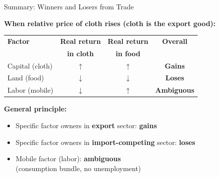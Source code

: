 \documentclass{beamer}
\begin{document}
\begin{frame}{Summary: Winners and Losers from Trade}

\textbf{When relative price of cloth rises (cloth is the export good):}

\vspace{0.3cm}

\begin{center}
\begin{tabular}{lccc}
\toprule
\textbf{Factor} & \textbf{Real return} & \textbf{Real return} & \textbf{Overall} \\
& \textbf{in cloth} & \textbf{in food} & \\
\midrule
\textcolor{capitalcolor}{Capital (cloth)} & $\uparrow$ & $\uparrow$ & \textcolor{capitalcolor}{\textbf{Gains}} \\
\textcolor{landcolor}{Land (food)} & $\downarrow$ & $\downarrow$ & \textcolor{landcolor}{\textbf{Loses}} \\
\textcolor{laborcolor}{Labor (mobile)} & $\downarrow$ & $\uparrow$ & \textcolor{laborcolor}{\textbf{Ambiguous}} \\
\bottomrule
\end{tabular}
\end{center}

\vspace{0.5cm}

\textbf{General principle:}
\begin{itemize}
    \item Specific factor owners in \textbf{export} sector: \textbf{gains}
    \item Specific factor owners in \textbf{import-competing} sector: \textbf{loses}
    \item Mobile factor (labor): \textbf{ambiguous} \\ (consumption bundle, no unemployment)
\end{itemize}

\end{frame}

\end{document}
